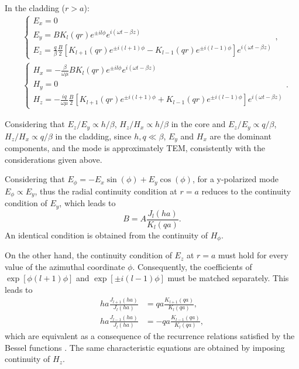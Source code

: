 In the cladding ($r>a$):
\begin{align}
    & \begin{cases}
        E_x = 0 \\
        E_y = B K_l(qr) e^{\pm il\phi} e^{i(\omega t - \beta z)} \\
        E_z = \frac{q}{\beta} \frac{B}{2} [K_{l+1}(qr)e^{\pm i(l+1)\phi} - K_{l-1}(qr)e^{\pm i(l-1)\phi}] e^{i(\omega t - \beta z)}
    \end{cases},\label{eq:E_cladding}   \\[3mm]
    & \begin{cases}
        H_x = -\frac{\beta}{\omega\mu} B K_l(qr) e^{\pm il\phi} e^{i(\omega t - \beta z)} \\
        H_y = 0 \\
        H_z = -\frac{iq}{\omega\mu} \frac{B}{2} [K_{l+1}(qr)e^{\pm i(l+1)\phi} + K_{l-1}(qr)e^{\pm i(l-1)\phi}] e^{i(\omega t - \beta z)}
    \end{cases}.\label{eq:H_cladding}
\end{align}

Considering that $E_z/E_y \propto h/\beta$, $H_z/H_x \propto h/\beta$ in the core and $E_z/E_y \propto q/\beta$, $H_z/H_x \propto q/\beta$ in the cladding, since $h,q \ll \beta$, $E_y$ and $H_x$ are the dominant components, and the mode is approximately TEM, consistently with the considerations given above.

Considering that $E_\phi = -E_x\sin(\phi) + E_y\cos(\phi)$, for a y-polarized mode $E_\phi \propto E_y$, thus the radial continuity condition at $r=a$ reduces to the continuity condition of $E_y$, which leads to
\begin{equation}
    \label{eq:B_A_relation}
    B=A\frac{J_l (ha)}{K_l(qa)}.
\end{equation}
An identical condition is obtained from the continuity of $H_\phi$.

On the other hand, the continuity condition of $E_z$ at $r=a$ must hold for every value of the azimuthal coordinate $\phi$. Consequently, the coefficients of $\exp[\phi(l+1)\phi]$ and $\exp[\pm i(l-1)\phi]$ must be matched separately. This leads to
\begin{align}
    ha \frac{J_{l+1}(ha)}{J_l(ha)} & = qa \frac{K_{l+1}(qa)}{K_l(qa)},  \label{eq:characteristic_equation_of_LP_modes}   \\[2.5mm]
    ha \frac{J_{l-1}(ha)}{J_l(ha)} & = -qa \frac{K_{l-1}(qa)}{K_l(qa)}, \label{eq:characteristic_equation_of_LP_modes_2}
\end{align}
which are equivalent as a consequence of the recurrence relations satisfied by the Bessel functions \cite{yariv2007photonics}. The same characteristic equations are obtained by imposing continuity of $H_z$.


